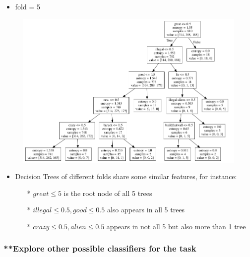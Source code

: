 \documentclass[11pt]{article}
\makeatletter
\def\maxwidth{\ifdim\Gin@nat@width>\linewidth\linewidth
    \else\Gin@nat@width\fi}
\let\Oldincludegraphics\includegraphics
\renewcommand{\includegraphics}[1]{\Oldincludegraphics[width=.8\maxwidth]{#1}}
\providecommand{\tightlist}{%
      \setlength{\itemsep}{0pt}\setlength{\parskip}{0pt}}
\makeatother
\begin{document}
\begin{itemize}
\tightlist
\item
  fold = 5
\end{itemize}

\begin{figure}[H]
\centering
\includegraphics{imgs/5.png}
\caption{}
\end{figure}

    \begin{itemize}
\tightlist
\item
  Decision Trees of different folds share some similar features, for
  instance:

  \begin{itemize}
  \tightlist
  \item[*]
    \(great \le 5\) is the root node of all 5 trees
  \item[*]
    \(illegal \le 0.5, good \le 0.5\) also appears in all 5 trees
  \item[*]
    \(crazy \le 0.5, alien \le 0.5\) appears in not all 5 but also more
    than 1 tree
  \end{itemize}
\end{itemize}

    \subsubsection*{**Explore other possible
classifiers for the task}\label{explore-other-classifiers}
\end{document}
